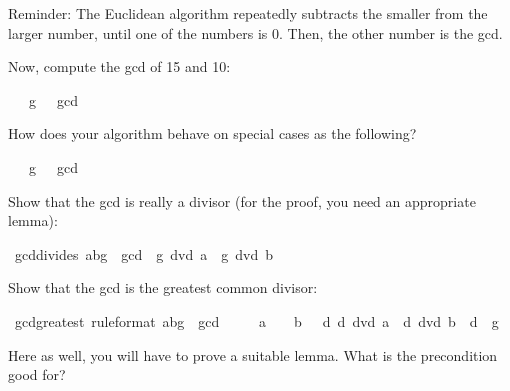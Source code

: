 \begin{isabellebody}
\begin{isamarkuptext}
Reminder: The Euclidean algorithm repeatedly subtracts the smaller
from the larger number, until one of the numbers is 0. Then, the other
number is the gcd.%
\end{isamarkuptext}%
\isamarkuptrue%
%
\begin{isamarkuptext}%
Now, compute the gcd of 15 and 10:%
\end{isamarkuptext}%
\isamarkuptrue%
\ {\isachardoublequote}{\isacharparenleft}{}{}{\isacharcomma}\ {}{}{\isacharcomma}\ {\isacharquery}g{\isacharparenright}\ \ {\isasymin}\ gcd{\isachardoublequote}\isamarkupfalse%
\isamarkupfalse%
%
\begin{isamarkuptext}%
How does your algorithm behave on special cases as the following?%
\end{isamarkuptext}%
\isamarkuptrue%
\ {\isachardoublequote}{\isacharparenleft}{}{\isacharcomma}\ {}{\isacharcomma}\ {\isacharquery}g{\isacharparenright}\ \ {\isasymin}\ gcd{\isachardoublequote}\isamarkupfalse%
\isamarkupfalse%
%
\begin{isamarkuptext}%
Show that the gcd is really a divisor (for the proof, you need an appropriate lemma):%
\end{isamarkuptext}%
\isamarkuptrue%
\ gcd{\isacharunderscore}divides{\isacharcolon}\ {\isachardoublequote}{\isacharparenleft}a{\isacharcomma}b{\isacharcomma}g{\isacharparenright}\ {\isasymin}\ gcd\ {\isasymLongrightarrow}\ g\ dvd\ a\ {\isasymand}\ g\ dvd\ b{\isachardoublequote}\isamarkupfalse%
\isamarkupfalse%
%
\begin{isamarkuptext}%
Show that the gcd is the greatest common divisor:%
\end{isamarkuptext}%
\isamarkuptrue%
\ gcd{\isacharunderscore}greatest\ {\isacharbrackleft}rule{\isacharunderscore}format{\isacharbrackright}{\isacharcolon}\ {\isachardoublequote}{\isacharparenleft}a{\isacharcomma}b{\isacharcomma}g{\isacharparenright}\ {\isasymin}\ gcd\ {\isasymLongrightarrow}\isanewline
\ \ {}\ {\isacharless}\ a\ {\isasymor}\ {}\ {\isacharless}\ b\ {\isasymlongrightarrow}\ {\isacharparenleft}{\isasymforall}\ d{\isachardot}\ d\ dvd\ a\ {\isasymlongrightarrow}\ d\ dvd\ b\ {\isasymlongrightarrow}\ d\ {\isasymle}\ g{\isacharparenright}{\isachardoublequote}\isamarkupfalse%
\isamarkupfalse%
%
\begin{isamarkuptext}%
Here as well, you will have to prove a suitable lemma. What is
the precondition  good for?


\end{isamarkuptext}
\end{isabellebody}
